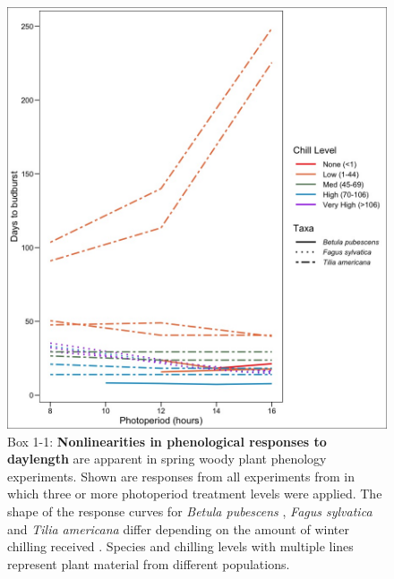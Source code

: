 \documentclass{article}
\begin{document}
\renewcommand{\thefigure}{\hspace{-.333333em}}

\begin{figure}[h]
\includegraphics{..//..//analyses/photoperiod/figures/Photo_curv_version2.jpeg} 
\caption{Box 1-1: \textbf{ Nonlinearities in phenological responses to daylength} are apparent in spring woody plant phenology experiments. Shown are responses from all experiments  from \citep{wolkovich2019}in which three or more photoperiod treatment levels were applied. The shape of the response curves for \textit{Betula pubescens} \citep{Caffarra:2011b}, \textit{Fagus sylvatica} \citep{Heide:1993a} and \textit{Tilia americana} \citep{Ashby:1962aa} differ depending on the amount of winter chilling received \citep[measured in Chill portions][]{fishman1987}. Species and chilling levels with multiple lines represent plant material from different populations.}


 \label{fig:photocurve}
 \end{figure}
\end{document}
